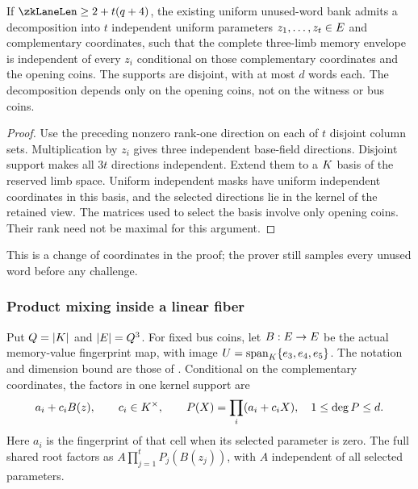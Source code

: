 \begin{lemma}\label{lem:zk-memory-root-kernel}
If $\zkLaneLen\ge2+t(q+4)$, the existing uniform unused-word bank admits a decomposition into $t$ independent uniform parameters $z_1,\ldots,z_t\in E$ and complementary coordinates, such that the complete three-limb memory envelope is independent of every $z_i$ conditional on those complementary coordinates and the opening coins. The supports are disjoint, with at most $d$ words each. The decomposition depends only on the opening coins, not on the witness or bus coins.
\end{lemma}
\begin{proof}
Use the preceding nonzero rank-one direction on each of $t$ disjoint column sets. Multiplication by $z_i$ gives three independent base-field directions. Disjoint support makes all $3t$ directions independent. Extend them to a $K$ basis of the reserved limb space. Uniform independent masks have uniform independent coordinates in this basis, and the selected directions lie in the kernel of the retained view. The matrices used to select the basis involve only opening coins. Their rank need not be maximal for this argument.
\end{proof}

This is a change of coordinates in the proof; the prover still samples every unused word before any challenge.

\subsubsection{Product mixing inside a linear fiber}

Put $Q=|K|$ and $|E|=Q^3$. For fixed bus coins, let $B:E\to E$ be the actual memory-value fingerprint map, with image $U=\operatorname{span}_{K}\{e_3,e_4,e_5\}$. The notation and dimension bound are those of . Conditional on the complementary coordinates, the factors in one kernel support are
\[
 a_i+c_iB(z),\qquad c_i\in K^\times,
 \qquad P(X)=\prod_i(a_i+c_iX),\quad 1\le\deg P\le d.
\]
Here $a_i$ is the fingerprint of that cell when its selected parameter is zero. The full shared root factors as $A\prod_{j=1}^tP_j(B(z_j))$, with $A$ independent of all selected parameters.

